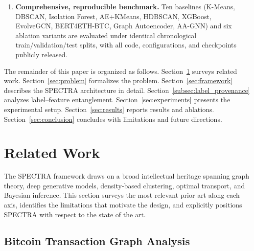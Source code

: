 \documentclass[journal]{IEEEtran}
\newcommand{\spectra}{\textsc{SPECTRA}}
\begin{document}
\begin{enumerate}[leftmargin=*, label=\textbf{C\arabic*}]
  \item \textbf{Comprehensive, reproducible benchmark.}
    Ten baselines (K-Means, DBSCAN, Isolation Forest,
    AE+KMeans, HDBSCAN, XGBoost, EvolveGCN, BERT4ETH-BTC, Graph
    Autoencoder, AA-GNN) and six ablation variants are evaluated under
    identical chronological train/validation/test splits, with all code,
    configurations, and checkpoints publicly released.

\end{enumerate}

The remainder of this paper is organized as follows.
Section~\ref{sec:related_work} surveys related work.
Section~\ref{sec:problem} formalizes the problem.
Section~\ref{sec:framework} describes the \spectra{} architecture in detail.
Section~\ref{subsec:label_provenance} analyzes label--feature entanglement.
Section~\ref{sec:experiments} presents the experimental setup.
Section~\ref{sec:results} reports results and ablations.
Section~\ref{sec:conclusion} concludes with limitations and future directions.

\FloatBarrier
\section{Related Work}
\label{sec:related_work}

The \spectra{} framework draws on a broad intellectual heritage spanning graph
theory, deep generative models, density-based clustering, optimal transport,
and Bayesian inference.  This section surveys the most relevant prior art along
each axis, identifies the limitations that motivate the design, and explicitly
positions \spectra{} with respect to the state of the art.

\subsection{Bitcoin Transaction Graph Analysis}
\label{subsec:bitcoin_graph}
\end{document}
